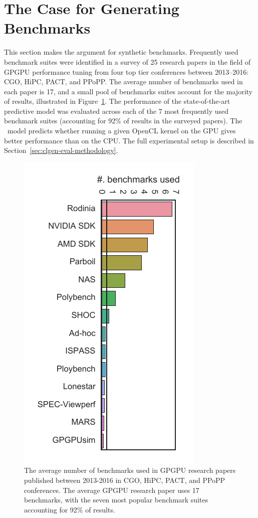 \section{The Case for Generating Benchmarks}%
\label{sec:the-case-for-benchmark-generators}

This section makes the argument for synthetic benchmarks. Frequently used benchmark suites were identified in a survey of 25 research papers in the field of GPGPU performance tuning from four top tier conferences between 2013--2016: CGO, HiPC, PACT, and PPoPP. The average number of benchmarks used in each paper is 17, and a small pool of benchmarks suites account for the majority of results, illustrated in Figure~\ref{fig:benchmark-suite-distribution}. The performance of the state-of-the-art \citeauthor{Grewe2013}~\cite{Grewe2013} predictive model was evaluated across each of the 7 most frequently used benchmark suites (accounting for 92\% of results in the surveyed papers). The \citeauthor{Grewe2013}~model predicts whether running a given OpenCL kernel on the GPU gives better performance than on the CPU. The full experimental setup is described in Section~\ref{sec:clgen-eval-methodology}.

\begin{figure}
	\centering
	\includegraphics[width=.57\textwidth,angle=90]{img/motivation-c} %
	\caption[Benchmark counts in GPGPU research papers]{%
		The average number of benchmarks used in GPGPU research papers published between 2013-2016 in CGO, HiPC, PACT, and PPoPP conferences. The average GPGPU research paper uses 17 benchmarks, with the seven most popular benchmark suites accounting for 92\% of results.%
	}%
	\label{fig:benchmark-suite-distribution}
\end{figure}

